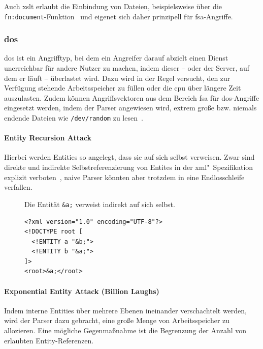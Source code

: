 Auch \acrfull{xslt} erlaubt die Einbindung von Dateien, beispielsweise über die \texttt{fn:document}-Funktion~\cite[Abschn. 20.1]{xslt} und eigenet sich daher prinzipell für \acrshort{fsa}-Angriffe.

\subsubsection{\acrfull{dos}}
\label{sec:xmlattacks-dos}

\acrlong{dos} ist ein Angrifftyp, bei dem ein Angreifer darauf abzielt einen Dienst unerreichbar für andere Nutzer zu machen, indem dieser -- oder der Server, auf dem er läuft -- überlastet wird. Dazu wird in der Regel versucht, den zur Verfügung stehende Arbeitsspeicher zu füllen oder die \acrshort{cpu} über längere Zeit auszulasten. Zudem können Angriffsvektoren aus dem Bereich \acrlong{fsa} für \acrshort{dos}-Angriffe eingesetzt werden, indem der Parser angewiesen wird, extrem große bzw. niemals endende Dateien wie \texttt{/dev/random} zu lesen~\cite[S.~13]{morgan2014xml}.

\paragraph{Entity Recursion Attack}
Hierbei werden Entities so angelegt, dass sie auf sich selbst verweisen. Zwar sind direkte und indirekte Selbstreferenzierung von Entites in der \acrshort{xml}"~Spezifikation explizit verboten~\cite[Abschnitt 4.1]{xml}, naive Parser könnten aber trotzdem in eine Endlosschleife verfallen.

\begin{figure}[h!]
\begin{example} Die Entität \texttt{&a;} verweist indirekt auf sich selbst.
    \begin{verbatim}
<?xml version="1.0" encoding="UTF-8"?>
<!DOCTYPE root [
  <!ENTITY a "&b;">
  <!ENTITY b "&a;">
]>
<root>&a;</root>
    \end{verbatim}
\end{example}
\end{figure}

\paragraph{Exponential Entity Attack (Billion Laughs)}
Indem interne Entities über mehrere Ebenen ineinander verschachtelt werden, wird der Parser dazu gebracht, eine große Menge von Arbeitsspeicher zu allozieren. Eine mögliche Gegenmaßnahme ist die Begrenzung der Anzahl von erlaubten Entity-Referenzen.


